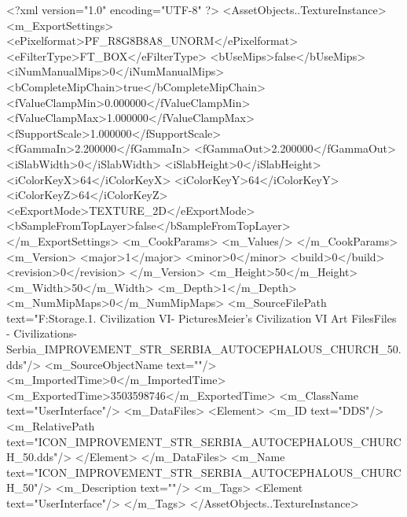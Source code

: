 <?xml version="1.0" encoding="UTF-8" ?>
<AssetObjects..TextureInstance>
	<m_ExportSettings>
		<ePixelformat>PF_R8G8B8A8_UNORM</ePixelformat>
		<eFilterType>FT_BOX</eFilterType>
		<bUseMips>false</bUseMips>
		<iNumManualMips>0</iNumManualMips>
		<bCompleteMipChain>true</bCompleteMipChain>
		<fValueClampMin>0.000000</fValueClampMin>
		<fValueClampMax>1.000000</fValueClampMax>
		<fSupportScale>1.000000</fSupportScale>
		<fGammaIn>2.200000</fGammaIn>
		<fGammaOut>2.200000</fGammaOut>
		<iSlabWidth>0</iSlabWidth>
		<iSlabHeight>0</iSlabHeight>
		<iColorKeyX>64</iColorKeyX>
		<iColorKeyY>64</iColorKeyY>
		<iColorKeyZ>64</iColorKeyZ>
		<eExportMode>TEXTURE_2D</eExportMode>
		<bSampleFromTopLayer>false</bSampleFromTopLayer>
	</m_ExportSettings>
	<m_CookParams>
		<m_Values/>
	</m_CookParams>
	<m_Version>
		<major>1</major>
		<minor>0</minor>
		<build>0</build>
		<revision>0</revision>
	</m_Version>
	<m_Height>50</m_Height>
	<m_Width>50</m_Width>
	<m_Depth>1</m_Depth>
	<m_NumMipMaps>0</m_NumMipMaps>
	<m_SourceFilePath text="F:\Mod Storage\2.1. Civilization VI\Mods\Archive - Pictures\Sid Meier's Civilization VI Art Files\Art Files - Civilizations\Civilization - Serbia\ICON_IMPROVEMENT_STR_SERBIA_AUTOCEPHALOUS_CHURCH_50.dds"/>
	<m_SourceObjectName text=""/>
	<m_ImportedTime>0</m_ImportedTime>
	<m_ExportedTime>3503598746</m_ExportedTime>
	<m_ClassName text="UserInterface"/>
	<m_DataFiles>
		<Element>
			<m_ID text="DDS"/>
			<m_RelativePath text="ICON_IMPROVEMENT_STR_SERBIA_AUTOCEPHALOUS_CHURCH_50.dds"/>
		</Element>
	</m_DataFiles>
	<m_Name text="ICON_IMPROVEMENT_STR_SERBIA_AUTOCEPHALOUS_CHURCH_50"/>
	<m_Description text=""/>
	<m_Tags>
		<Element text="UserInterface"/>
	</m_Tags>
</AssetObjects..TextureInstance>

